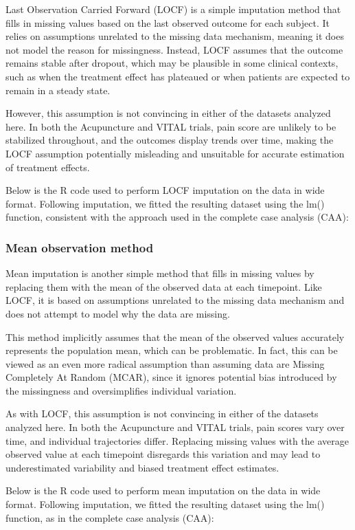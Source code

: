 \documentclass{article}
\begin{document}
Last Observation Carried Forward (LOCF) is a simple imputation method
that fills in missing values based on the last observed outcome for each
subject. It relies on assumptions unrelated to the missing data
mechanism, meaning it does not model the reason for missingness.
Instead, LOCF assumes that the outcome remains stable after dropout,
which may be plausible in some clinical contexts, such as when the
treatment effect has plateaued or when patients are expected to remain
in a steady state.

However, this assumption is not convincing in either of the datasets
analyzed here. In both the Acupuncture and VITAL trials, pain score are
unlikely to be stabilized throughout, and the outcomes display trends
over time, making the LOCF assumption potentially misleading and
unsuitable for accurate estimation of treatment effects.

Below is the R code used to perform LOCF imputation on the data in wide
format. Following imputation, we fitted the resulting dataset using the
lm() function, consistent with the approach used in the complete case
analysis (CAA):

\subsubsection{Mean observation method}\label{mean-observation-method}

Mean imputation is another simple method that fills in missing values by
replacing them with the mean of the observed data at each timepoint.
Like LOCF, it is based on assumptions unrelated to the missing data
mechanism and does not attempt to model why the data are missing.

This method implicitly assumes that the mean of the observed values
accurately represents the population mean, which can be problematic. In
fact, this can be viewed as an even more radical assumption than
assuming data are Missing Completely At Random (MCAR), since it ignores
potential bias introduced by the missingness and oversimplifies
individual variation.

As with LOCF, this assumption is not convincing in either of the
datasets analyzed here. In both the Acupuncture and VITAL trials, pain
scores vary over time, and individual trajectories differ. Replacing
missing values with the average observed value at each timepoint
disregards this variation and may lead to underestimated variability and
biased treatment effect estimates.

Below is the R code used to perform mean imputation on the data in wide
format. Following imputation, we fitted the resulting dataset using the
lm() function, as in the complete case analysis (CAA):
\end{document}

